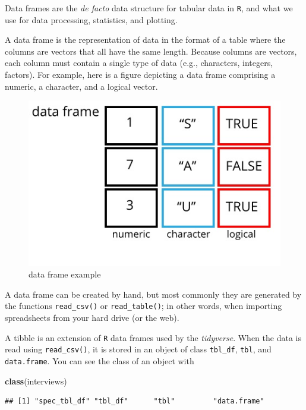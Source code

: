 \documentclass[]{book}
\newenvironment{Shaded}{\begin{snugshade}}{\end{snugshade}}
\newcommand{\KeywordTok}[1]{\textcolor[rgb]{0.13,0.29,0.53}{\textbf{#1}}}
\newcommand{\NormalTok}[1]{#1}
\begin{document}
Data frames are the \emph{de facto} data structure for tabular data in
\texttt{R}, and what we use for data processing, statistics, and
plotting.

A data frame is the representation of data in the format of a table
where the columns are vectors that all have the same length. Because
columns are vectors, each column must contain a single type of data
(e.g., characters, integers, factors). For example, here is a figure
depicting a data frame comprising a numeric, a character, and a logical
vector.

\begin{figure}
\centering
\includegraphics{./fig/data-frame.png}
\caption{data frame example}
\end{figure}

A data frame can be created by hand, but most commonly they are
generated by the functions \texttt{read\_csv()} or
\texttt{read\_table()}; in other words, when importing spreadsheets from
your hard drive (or the web).

A tibble is an extension of \texttt{R} data frames used by the
\emph{tidyverse}. When the data is read using \texttt{read\_csv()}, it
is stored in an object of class \texttt{tbl\_df}, \texttt{tbl}, and
\texttt{data.frame}. You can see the class of an object with

\begin{Shaded}
\begin{Highlighting}[]
\KeywordTok{class}\NormalTok{(interviews)}
\end{Highlighting}
\end{Shaded}

\begin{verbatim}
## [1] "spec_tbl_df" "tbl_df"      "tbl"         "data.frame"
\end{verbatim}
\end{document}
